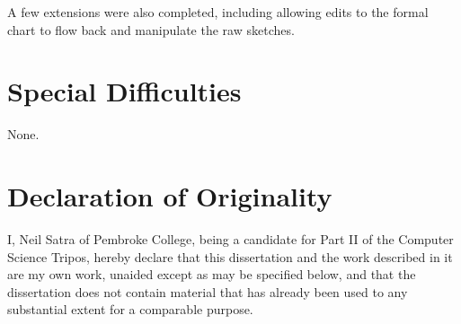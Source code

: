 A few extensions were also completed, including allowing edits to the formal chart to flow back and manipulate the raw sketches.

\section*{Special Difficulties}
None.

\section*{Declaration of Originality}

I, Neil Satra of Pembroke College, being a candidate for Part II of the Computer
Science Tripos, hereby declare that this dissertation and the work described in it are my own work, unaided except as may be specified below, and that the dissertation does not contain material that has already been used to any substantial extent for a comparable purpose.

\bigskip
{}

\medskip
{}


\clearpage